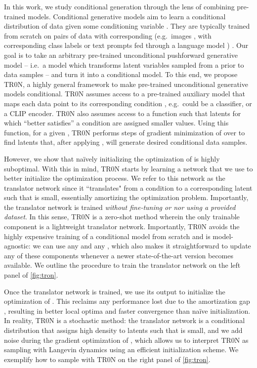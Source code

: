 \documentclass[nohyperref]{article}
\theoremstyle{plain}
\theoremstyle{definition}
\theoremstyle{remark}
\begin{document}
In this work, we study conditional generation through the lens of combining pre-trained models. 
Conditional generative models aim to learn a conditional distribution of data given some conditioning variable . 
They are typically trained from scratch on pairs of data with corresponding  (e.g.\ images , with corresponding class labels or text prompts fed through a language model ) \citep{mirza2014conditional, sohn2015learning}. Our goal is to take an arbitrary pre-trained unconditional pushforward generative model \citep{salmona2022can, ross2022neural} --  i.e.\ a model  which transforms latent variables  sampled from a prior  to data samples  -- and turn it into a conditional model. To this end, we propose TR0N, a highly general framework to make pre-trained unconditional generative models conditional. TR0N assumes access to a pre-trained auxiliary model  that maps each data point  to its corresponding condition , e.g.\  could be a classifier, or a CLIP encoder. TR0N also assumes access to a function  such that latents  for which  ``better satisfies'' a condition  are assigned smaller values. Using this function, for a given , TR0N performs  steps of gradient minimization of  over  to find latents that, after applying , will generate desired conditional data samples.

However, we show that na\"ively initializing the optimization of  is highly suboptimal. With this in mind, TR0N starts by learning a network that we use to better initialize the optimization process. We refer to this network as the translator network since it ``translates" from a condition  to a corresponding latent  such that  is small, essentially amortizing the optimization problem. Importantly, the translator network is trained \emph{without fine-tuning  or  nor using a provided dataset}. In this sense, TR0N is a zero-shot method wherein the only trainable component is a lightweight translator network. Importantly, TR0N avoids the highly expensive training of a conditional model from scratch and is model-agnostic: we can use any  and any , which also makes it straightforward to update any of these components whenever a newer state-of-the-art version becomes available. We outline the procedure to train the translator network on the left panel of \autoref{fig:tron}.

Once the translator network is trained, we use its output to initialize the optimization of . This reclaims any performance lost due to the amortization gap \citep{cremer2018inference,kim2018semi}, resulting in better local optima and faster convergence than na\"ive initialization. In reality, TR0N is a stochastic method: the translator network is a conditional distribution  that assigns high density to latents  such that  is small, and we add noise during the gradient optimization of , which allows us to interpret TR0N as sampling with Langevin dynamics \citep{welling2011bayesian} using an efficient initialization scheme. We exemplify how to sample with TR0N on the right panel of \autoref{fig:tron}.
\end{document}

